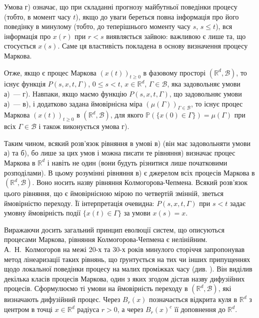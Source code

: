 \documentclass[11pt, reqno]{amsart}
\begin{document}
Умова г) означає, що при складанні прогнозу майбутньої поведінки процесу (тобто, в момент часу $t$), якщо до уваги береться повна інформація про його поведінку в минулому (тобто, до теперішнього моменту часу $s$, $s\le t$), вся інформація про $x(r)$ при $r<s$ виявляється зайвою: важливою є лише та, що стосується $x(s)$. Саме ця властивість покладена в основу визначення процесу Маркова.

Отже, якщо є процес Маркова $(x(t))_{t\geq 0}$ в фазовому просторі $(\mathbb{R}^d, \mathcal{B})$, то існує функція $P(s,x,t,\Gamma)$, $0\leq s<t$, $x\in\mathbb{R}^d$, $\Gamma\in\mathcal{B}$, яка задовольняє умови  а)~--- г). Навпаки, якщо маємо функцію $P(s,x,t,\Gamma)$, що задовольняє умови а)~--- в), і додатково задана ймовірнісна міра $\left(\mu(\Gamma)\right)_{\Gamma\in\mathcal{B}}$, то існує процес Маркова $(x(t))_{t\geq 0}$ в $(\mathbb{R}^d, \mathcal{B})$, для якого $\mathbb{P}\left(\{x(0)\in\Gamma\}\right)=\mu(\Gamma)$ при всіх $\Gamma\in\mathcal{B}$ і також виконується умова г).

Таким чином, всякий розв'язок рівняння в умові в) (він має задовольняти умови а) та б), бо лише за цих умов і можна писати те рівняння) визначає процес Маркова в $\mathbb{R}^d$ і навіть не один (вони будуть різнитися лише початковими розподілами). В цьому розумінні рівняння в) є джерелом всіх процесів Маркова в $(\mathbb{R}^d, \mathcal{B})$.  Воно носить назву рівняння Колмогорова-Чепмена. Всякий розв'язок цього рівняння, що є ймовірнісною мірою по четвертій змінній, зветься ймовірністю переходу. Її інтерпретація очевидна: $P(s,x,t,\Gamma)$ при $s<t$ задає умовну ймовірність події $\{x(t)\in\Gamma\}$ за умови $x(s)=x$.

Виражаючи досить загальний принцип еволюції систем, що описуються процесами Маркова, рівняння Колмогорова-Чепмена є нелінійним. А.~Н.~Колмогоров на межі 20-х та 30-х років минулого сторіччя запропонував метод лінеаризації таких рівнянь, що ґрунтується на тих чи інших припущеннях щодо локальної поведінки процесу на малих проміжках часу (див. \cite{b1}). Він виділив декілька класів процесів Маркова, один з яких згодом дістав назву дифузійних процесів. Сформулюємо ті умови на ймовірність переходу в $(\mathbb{R}^d, \mathcal{B})$, які визначають дифузійний процес. Через $B_{r}(x)$ позначається відкрита куля в $\mathbb{R}^d$ з центром в точці $x\in\mathbb{R}^d$ радіуса $r>0$, а через $B_{r}(x)^{c}$ її доповнення до $\mathbb{R}^d$.
\end{document}
